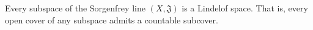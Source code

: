 Every subspace of the Sorgenfrey line $(X, \mathfrak{J})$ is a Lindelof space. That is, every open cover of any subspace admits a countable subcover.
